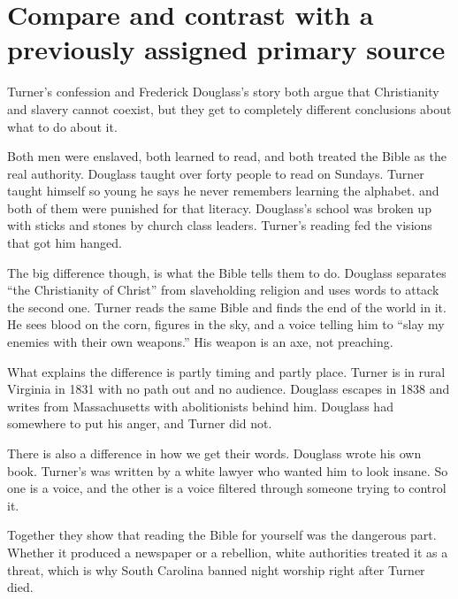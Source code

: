 \documentclass[12pt]{article}
\begin{document}
\section*{Compare and contrast with a previously assigned primary source}

Turner's confession and Frederick Douglass's story both argue that Christianity and slavery cannot coexist, but they get to completely different conclusions about what to do about it.

Both men were enslaved, both learned to read, and both treated the Bible as the real authority. Douglass taught over forty people to read on Sundays. Turner taught himself so young he says he never remembers learning the alphabet. and both of them were punished for that literacy. Douglass's school was broken up with sticks and stones by church class leaders. Turner's reading fed the visions that got him hanged.

The big difference though, is what the Bible tells them to do. Douglass separates ``the Christianity of Christ'' from slaveholding religion and uses words to attack the second one. Turner reads the same Bible and finds the end of the world in it. He sees blood on the corn, figures in the sky, and a voice telling him to ``slay my enemies with their own weapons.'' His weapon is an axe, not preaching.

What explains the difference is partly timing and partly place. Turner is in rural Virginia in 1831 with no path out and no audience. Douglass escapes in 1838 and writes from Massachusetts with abolitionists behind him. Douglass had somewhere to put his anger, and Turner did not.

There is also a difference in how we get their words. Douglass wrote his own book. Turner's was written by a white lawyer who wanted him to look insane. So one is a voice, and the other is a voice filtered through someone trying to control it.

Together they show that reading the Bible for yourself was the dangerous part. Whether it produced a newspaper or a rebellion, white authorities treated it as a threat, which is why South Carolina banned night worship right after Turner died.
\end{document}
